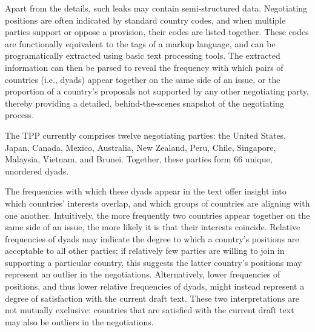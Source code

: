 \documentclass[12pt]{article}
\begin{document}
Apart from the details, such leaks may contain semi-structured data. 
Negotiating positions are often indicated by standard country codes, and when multiple parties 
support or oppose a provision, their codes are listed together. These codes are functionally 
equivalent to the tags of a markup language, and 
can be programatically extracted using basic text processing tools. 
The extracted information can then be parsed to reveal the frequency with which pairs of countries (i.e., dyads) appear together on the same side of an issue, 
or the proportion of a country's proposals not supported by any other negotiating party, thereby 
providing a detailed, behind-the-scenes snapshot of the negotiating 
process.

The TPP currently comprises twelve negotiating parties: the United States, Japan, Canada, Mexico, 
Australia, New Zealand, Peru, Chile, Singapore, Malaysia, Vietnam, and Brunei. Together, 
these parties form 66 unique, unordered dyads. 

The frequencies with which these dyads appear in the text offer insight into which countries' interests overlap, 
and which groups of countries are 
aligning with one another. Intuitively, the more frequently two countries appear together on the same 
side of an issue, the more likely it is that their interests coincide. Relative frequencies of 
dyads may indicate the degree to which a country's positions are acceptable to all other parties; if relatively 
few parties are willing to join in supporting a particular country, this suggests the latter country's 
positions may represent an outlier in the negotiations. Alternatively, lower frequencies of positions, 
and thus lower relative frequencies of dyads, might instead represent a degree of satisfaction with 
the current draft text. These two interpretations are not mutually exclusive: countries that are 
satisfied with the current draft text may also be outliers in the negotiations.
\end{document}
